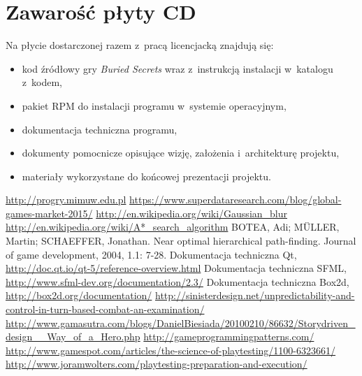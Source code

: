 \documentclass[licencjacka]{pracamgr}
\begin{document}
   
   
   

\chapter{Zawarość płyty CD}
  Na płycie dostarczonej razem z~pracą licencjacką znajdują się:
  \begin{itemize}
   \item kod źródłowy gry \emph{Buried Secrets} wraz z~instrukcją instalacji w~katalogu z~kodem,
   \item pakiet RPM do instalacji programu w~systemie operacyjnym,
   \item dokumentacja techniczna programu,
   \item dokumenty pomocnicze opisujące wizję, założenia i~architekturę projektu,
   \item materiały wykorzystane do końcowej prezentacji projektu.
  \end{itemize}

\begin{thebibliography}{99}

   \url{http://progry.mimuw.edu.pl}
   \url{https://www.superdataresearch.com/blog/global-games-market-2015/}
   \url{http://en.wikipedia.org/wiki/Gaussian_blur}
   \url{http://en.wikipedia.org/wiki/A*_search_algorithm}
   BOTEA, Adi; MÜLLER, Martin; SCHAEFFER, Jonathan. Near optimal hierarchical path-finding. Journal of game development, 2004, 1.1: 7-28.
   Dokumentacja techniczna Qt, \url{http://doc.qt.io/qt-5/reference-overview.html}
   Dokumentacja techniczna SFML, \url{http://www.sfml-dev.org/documentation/2.3/}
   Dokumentacja techniczna Box2d, \url{http://box2d.org/documentation/}
   \url{http://sinisterdesign.net/unpredictability-and-control-in-turn-based-combat-an-examination/}
   \url{http://www.gamasutra.com/blogs/DanielBiesiada/20100210/86632/Storydriven_design__Way_of_a_Hero.php}
   \url{http://gameprogrammingpatterns.com/}
   \url{http://www.gamespot.com/articles/the-science-of-playtesting/1100-6323661/}
   \url{http://www.joramwolters.com/playtesting-preparation-and-execution/}
    
\end{thebibliography}
\end{document}
